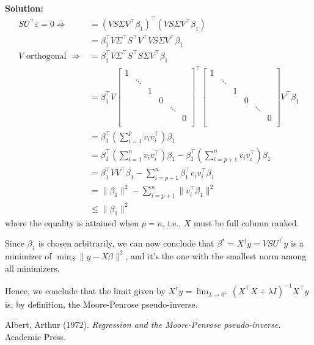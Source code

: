 \documentclass[11pt]{article}
\theoremstyle{plain} %
\newenvironment{solution}
{\color{C2}\normalfont\begin{framed}\begingroup\textbf{Solution:} }
  {\endgroup\end{framed}}
\theoremstyle{remark}
\begin{document}
\begin{solution}
\begin{align*}
        SU^\top \varepsilon=0\Longrightarrow&= (V S \Sigma V^\top \beta_1)^\top  (V S \Sigma V^\top \beta_1 )\\
        &= \beta_1^\top V \Sigma^\top S^\top V^\top VS\Sigma V^\top \beta_1\\
        V \text{ orthogonal } \Longrightarrow
        &= \beta_1^\top V \Sigma^\top S^\top S\Sigma V^\top \beta_1\\
        &=\beta_1^\top V\begin{bmatrix}
        1 & &  & & &\\
        & \ddots &  &  & &\\
         & & 1 & & & \\
         & &  & 0 & & \\
         &  &  &  & \ddots & \\
         &  &  &  & &  0\\
    \end{bmatrix}^\top\begin{bmatrix}
        1 & &  & & &\\
        & \ddots &  & & & \\
         & & 1 & & & \\
         & &  & 0 & & \\
         &  &  &  & \ddots & \\
         &  &  &  & &  0\\
    \end{bmatrix}V^\top \beta_1\\
    &= \beta_1^\top \left(\sum_{i=1}^p v_iv_i^\top\right) \beta_1\\
    &= \beta_1^\top \left(\sum_{i=1}^n v_iv_i^\top\right) \beta_1 - \beta_1^\top \left(\sum_{i=p+1}^n v_iv_i^\top\right) \beta_1\\
    &= \beta_1^\top VV^\top \beta_1 - \sum_{i=p+1}^n\beta_1^\top v_iv_i^\top\beta_1\\
    &= \|\beta_1\|^2 - \sum_{i=p+1}^n \|v_i^\top\beta_1\|^2\\
    &\le \|\beta_1\|^2
    \end{align*}
    where the equality is attained when $p = n$, i.e., $X$ must be full column ranked.
    
    Since $\beta_1$ is chosen arbitrarily,  we can now conclude that $\beta^* = X^\dagger y = V S U^\top y$ is a minimizer of $\min_{\beta}\|y-X \beta\|^2$, and it's the one with the smallest norm among all minimizers.
    
    Hence, we conclude that the limit given by $X^\dagger y=\lim _{\lambda \rightarrow 0^{+}}\left(X^\top X+\lambda I\right)^{-1} X^\top y$ is, by definition, the Moore-Penrose pseudo-inverse.
\end{solution}


\begin{thebibliography}{1}

Albert, Arthur (1972).
\textit{Regression and the Moore-Penrose pseudo-inverse}. 
Academic Press.

\end{thebibliography}
\end{document}
